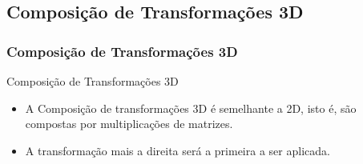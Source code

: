 \documentclass{beamer}
\begin{document}
%	
%	
%
%
%		
%			
%	


\begin{frame}
\section{Composição de Transformações 3D}
\frametitle{Composição de Transformações 3D}
	\begin{block}{Composição de Transformações 3D}
		\begin{itemize}
			\item A Composição de transformações 3D é semelhante a 2D, isto é, são compostas por multiplicações de matrizes.
			\item A transformação mais a direita será a primeira a ser aplicada.
		\end{itemize}
	\end{block}

\end{frame}
\end{document}
